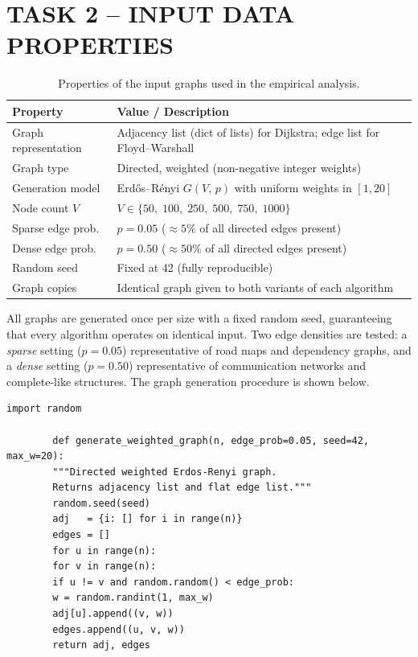 \documentclass[12pt,a4paper]{article}
\begin{document}
	\section{TASK 2 -- INPUT DATA PROPERTIES}
	
	\begin{table}[h!]
		\centering
		\caption{Properties of the input graphs used in the empirical analysis.}
		\label{tab:input}
		\renewcommand{\arraystretch}{1.3}
		\begin{tabular}{ll}
			\toprule
			\textbf{Property}    & \textbf{Value / Description} \\
			\midrule
			Graph representation & Adjacency list (dict of lists) for Dijkstra; edge list for Floyd--Warshall \\
			Graph type           & Directed, weighted (non-negative integer weights) \\
			Generation model     & Erd\H{o}s--R\'{e}nyi $G(V,\,p)$ with uniform weights in $[1, 20]$ \\
			Node count $V$       & $V \in \{50,\;100,\;250,\;500,\;750,\;1000\}$ \\
			Sparse edge prob.\   & $p = 0.05$ ($\approx 5\%$ of all directed edges present) \\
			Dense edge prob.\    & $p = 0.50$ ($\approx 50\%$ of all directed edges present) \\
			Random seed          & Fixed at 42 (fully reproducible) \\
			Graph copies         & Identical graph given to both variants of each algorithm \\
			\bottomrule
		\end{tabular}
	\end{table}
	
	\noindent All graphs are generated once per size with a fixed random seed,
	guaranteeing that every algorithm operates on identical input. Two edge
	densities are tested: a \emph{sparse} setting ($p = 0.05$) representative of
	road maps and dependency graphs, and a \emph{dense} setting ($p = 0.50$)
	representative of communication networks and complete-like structures. The graph
	generation procedure is shown below.
	
	\begin{lstlisting}[caption={Weighted directed graph generator -- Erdos-Renyi $G(V,p)$ with random weights.}]
		import random
		
		def generate_weighted_graph(n, edge_prob=0.05, seed=42, max_w=20):
		"""Directed weighted Erdos-Renyi graph.
		Returns adjacency list and flat edge list."""
		random.seed(seed)
		adj   = {i: [] for i in range(n)}
		edges = []
		for u in range(n):
		for v in range(n):
		if u != v and random.random() < edge_prob:
		w = random.randint(1, max_w)
		adj[u].append((v, w))
		edges.append((u, v, w))
		return adj, edges
	\end{lstlisting}
	
\end{document}
